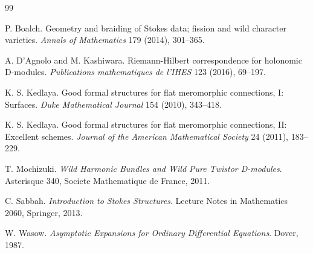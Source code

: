 \documentclass[11pt]{article}
\begin{document}
\begin{thebibliography}{99}

P. Boalch.
Geometry and braiding of Stokes data; fission and wild character varieties.
\emph{Annals of Mathematics} 179 (2014), 301--365.

A. D'Agnolo and M. Kashiwara.
Riemann-Hilbert correspondence for holonomic D-modules.
\emph{Publications mathematiques de l'IHES} 123 (2016), 69--197.

K. S. Kedlaya.
Good formal structures for flat meromorphic connections, I: Surfaces.
\emph{Duke Mathematical Journal} 154 (2010), 343--418.

K. S. Kedlaya.
Good formal structures for flat meromorphic connections, II: Excellent schemes.
\emph{Journal of the American Mathematical Society} 24 (2011), 183--229.

T. Mochizuki.
\emph{Wild Harmonic Bundles and Wild Pure Twistor D-modules}.
Asterisque 340, Societe Mathematique de France, 2011.

C. Sabbah.
\emph{Introduction to Stokes Structures}.
Lecture Notes in Mathematics 2060, Springer, 2013.

W. Wasow.
\emph{Asymptotic Expansions for Ordinary Differential Equations}.
Dover, 1987.

\end{thebibliography}
\end{document}
